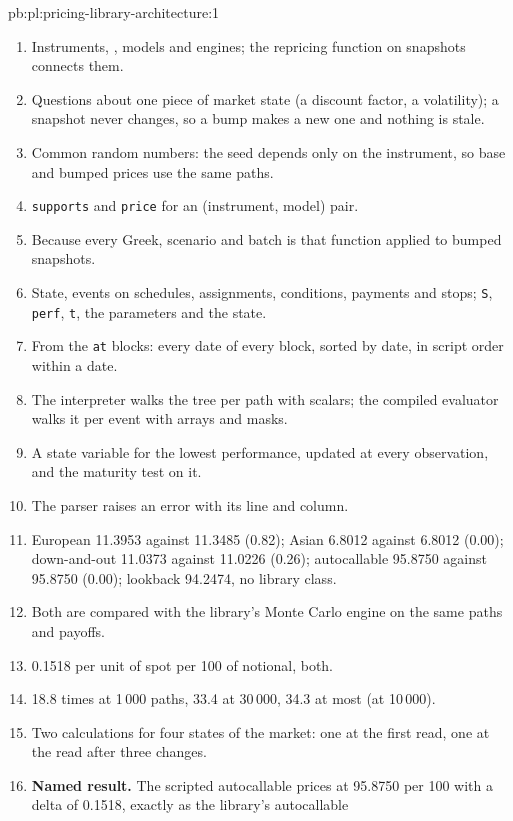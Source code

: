\begin{solution}{pb:pl:pricing-library-architecture:1}
\begin{enumerate}
\item Instruments, , models and engines; the repricing function on snapshots connects them.
\item Questions about one piece of market state (a discount factor, a volatility); a snapshot never changes, so a bump makes a new one and
nothing is stale.
\item Common random numbers: the seed depends only on the instrument, so base and bumped prices use the same paths.
\item \texttt{supports} and \texttt{price} for an (instrument, model) pair.
\item Because every Greek, scenario and batch is that function applied to bumped snapshots.
\item State, events on schedules, assignments, conditions, payments and stops; \texttt{S}, \texttt{perf}, \texttt{t}, the parameters and the
state.
\item From the \texttt{at} blocks: every date of every block, sorted by date, in script order within a date.
\item The interpreter walks the tree per path with scalars; the compiled evaluator walks it per event with arrays and masks.
\item A state variable for the lowest performance, updated at every observation, and the maturity test on it.
\item The parser raises an error with its line and column.
\item European 11.3953 against 11.3485 (0.82); Asian 6.8012 against 6.8012 (0.00); down-and-out 11.0373 against 11.0226 (0.26);
autocallable 95.8750 against 95.8750 (0.00); lookback 94.2474, no library class.
\item Both are compared with the library's Monte Carlo engine on the same paths and payoffs.
\item 0.1518 per unit of spot per 100 of notional, both.
\item 18.8 times at 1\,000 paths, 33.4 at 30\,000, 34.3 at most (at 10\,000).
\item Two calculations for four states of the market: one at the first read, one at the read after three changes.
\item \textbf{Named result.} The scripted autocallable prices at 95.8750 per 100 with a delta of 0.1518, exactly as the library's autocallable

\end{enumerate}
\end{solution}
